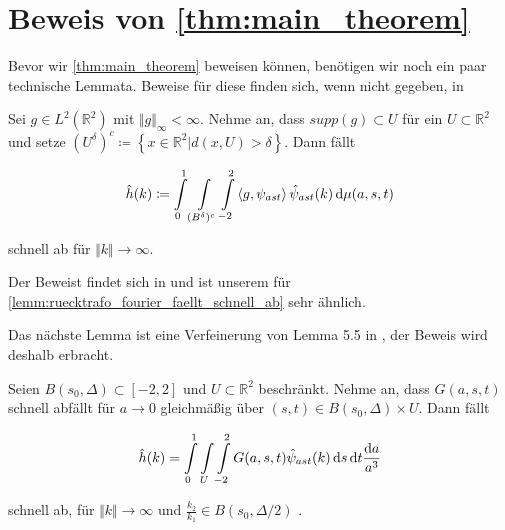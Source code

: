 \section{\texorpdfstring{Beweis von \cref{thm:main_theorem}}{Beweis des Hauptsatzes}} %
\label{sec:beweis_von_thm:main_theorem}


Bevor wir \cref{thm:main_theorem} beweisen können, benötigen wir noch ein paar technische Lemmata. Beweise für diese finden sich, wenn nicht gegeben, in \cite{Kutyniok2008}

\begin{lemma}
\label{lemm:lemma54}
    Sei $g \in L^2(\mathbb{R}^2)$ mit $\Vert g\Vert_\infty < \infty$. Nehme an, dass $supp (g) \subset U$ für ein $U \subset \mathbb{R}^2$ und setze
    $(U^\delta)^c \coloneqq \left\{x \in \mathbb{R}^2 | d(x,U) > \delta\right\}$.
    Dann fällt

    \begin{equation*}
        \hat h(k) \coloneqq \int \limits_0^1 \int \limits_{(B^\delta)^c} \int \limits_{-2}^{2} \left<g,\psi_{ast}\right> \hat \psi_{ast}(k) \mathop{}\!\mathrm{d} \mu (a,s,t)
    \end{equation*}

    schnell ab für $\Vert k \Vert \to \infty$.
\end{lemma}

Der Beweist findet sich in \cite{Kutyniok2008} und ist unserem für \cref{lemm:ruecktrafo_fourier_faellt_schnell_ab} sehr ähnlich.

Das nächste Lemma ist eine Verfeinerung von Lemma 5.5 in \textcite{Kutyniok2008}, der Beweis wird deshalb erbracht.
\begin{lemma}
\label{lemm:ruecktrafo_fourier_faellt_schnell_ab}

Seien $B(s_0,\Delta) \subset [-2,2]$ und $U \subset \mathbb{R}^2$ beschränkt. Nehme an, dass $G(a,s,t)$ schnell abfällt für $a \to 0$ gleichmäßig über $(s,t) \in  B(s_0,\Delta) \times U$. Dann fällt

\begin{equation*}
    \hat h(k) = \int \limits_0^1 \int \limits_U \int \limits_{-2}^2
    G(a,s,t) \hat \psi_{ast} (k)
        \mathop{}\!\mathrm{d} s \mathop{}\!\mathrm{d} t \frac{\mathop{}\!\mathrm{d} a}{a^3}
\end{equation*}

schnell ab, für $\Vert k \Vert \to \infty$ und $\frac{k_2}{k_1} \in B(s_0, \Delta/2)$ .
\end{lemma}


